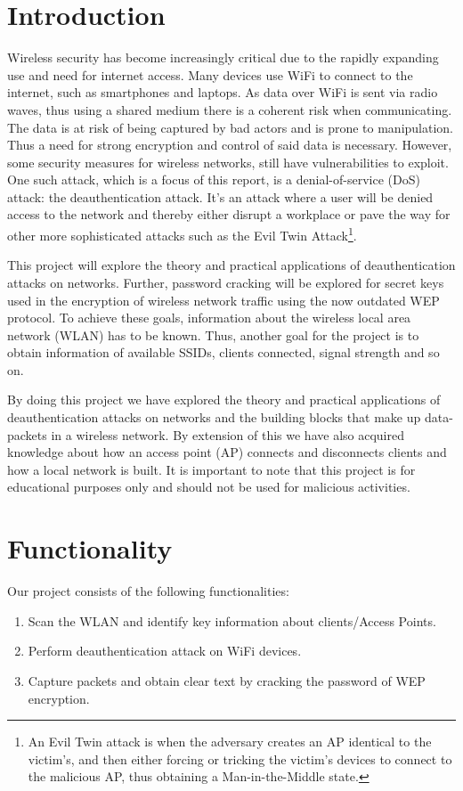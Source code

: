 \section{Introduction}
Wireless security has become increasingly critical due to the rapidly expanding use and need for internet access. Many devices use WiFi to connect to the internet, such as smartphones and laptops. As data over WiFi is sent via radio waves, thus using a shared medium there is a coherent risk when communicating. The data is at risk of being captured by bad actors and is prone to manipulation. Thus a need for strong encryption and control of said data is necessary. However, some security measures for wireless networks, still have vulnerabilities to exploit. One such attack, which is a focus of this report, is a denial-of-service (DoS) attack: the deauthentication attack. It's an attack where a user will be denied access to the network and thereby either disrupt a workplace or pave the way for other more sophisticated attacks such as the Evil Twin Attack\footnote{An Evil Twin attack is when the adversary creates an AP identical to the victim's, and then either forcing or tricking the victim's devices to connect to the malicious AP, thus obtaining a Man-in-the-Middle state.}.

This project will explore the theory and practical applications of deauthentication attacks on networks. Further, password cracking will be explored for secret keys used in the encryption of wireless network traffic using the now outdated WEP protocol. To achieve these goals, information about the wireless local area network (WLAN) has to be known. Thus, another goal for the project is  to obtain information of available SSIDs, clients connected, signal strength and so on.

By doing this project we have explored the theory and practical applications of deauthentication attacks on networks and the building blocks that make up data-packets in a wireless network. By extension of this we have also acquired knowledge about how an access point (AP) connects and disconnects clients and how a local network is built. It is important to note that this project is for educational purposes only and should not be used for malicious activities.


\section{Functionality}
Our project consists of the following functionalities:
\begin{enumerate}
    \item Scan the WLAN and identify key information about clients/Access Points.
    \item Perform deauthentication attack on WiFi devices.
    \item Capture packets and obtain clear text by cracking the password of WEP encryption.
\end{enumerate}

